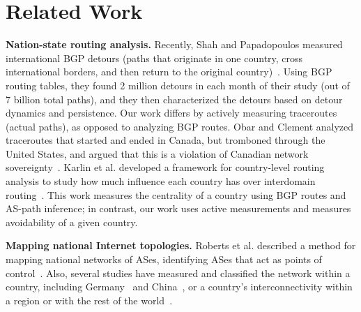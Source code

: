 \section{Related Work}
\label{related}

\textbf{Nation-state routing analysis.}  Recently, Shah and
Papadopoulos measured international BGP detours (paths that originate in
one country, cross international borders, and then return to the
original country)~\cite{shah2015characterizing}.  Using BGP routing
tables, they found 2 million detours in each month of their study (out
of 7 billion total paths), and they then characterized the detours based
on detour dynamics and persistence.  Our work differs by actively
measuring traceroutes (actual paths), as opposed to analyzing BGP
routes.  Obar and Clement analyzed traceroutes
that started and ended in Canada, but tromboned through the United
States, and argued that
this is a violation of Canadian network
sovereignty~\cite{obar2012internet}. 
Karlin et al. developed a framework for country-level
routing analysis to study how much influence each country has over
interdomain routing~\cite{karlin2009nation}.  This work measures the
centrality of a country using BGP routes and AS-path inference; in contrast, our work uses active 
measurements and measures avoidability of a given country. 

\textbf{Mapping national Internet topologies.}  Roberts et
al. described a method for mapping national networks of ASes,
identifying ASes that act as points of control~\cite{roberts2011mapping}.  
Also, several studies have measured and classified the network within
a country, including
Germany~\cite{wahlisch2010framework,wahlisch2012exposing} and
China~\cite{zhou2007chinese}, or a country's interconnectivity within
a region or with the rest of the
world~\cite{bischof2015and,gupta2014peering,fanou2015diversity}.

